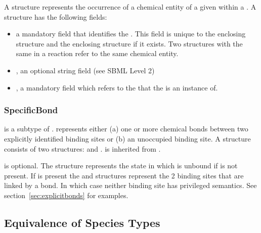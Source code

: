 \documentclass{cekarticle}
\begin{document}
A  structure represents the occurrence of a chemical entity of a given
 within a .  A  structure has the
following fields:

\begin{itemize}

\item {} a mandatory  field that identifies
the . This field is unique to the
enclosing  structure and the enclosing
 structure if it exists.  Two
 structures with the same 
in a reaction refer to the same chemical entity.

\item {}, an optional string field (see SBML Level 2)

\item {}, a mandatory  field which
refers to the  that the
 is an instance of.

\end{itemize}

\subsubsection{SpecificBond}

 is a subtype of .
 represents either (a) one or more chemical
bonds between two explicitly identified binding sites or (b) an
unoccupied binding site.  A  structure consists of two
 structures:  and
.  is
inherited from .

 is optional. The
 structure represents the state in which
 is unbound if
 is not present. If
 is present the
 and 
structures represent the 2 binding sites that are linked by a
bond. In which case neither binding site has privileged semantics.
See section~\ref{sec:explicitbonds} for examples.

\subsection{Equivalence of Species Types}
\label{sec:type-equals}
\end{document}
